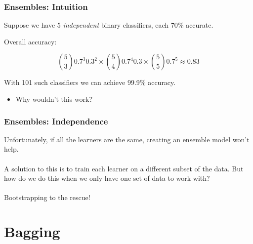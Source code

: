 \documentclass[table,dvipsnames]{beamer}
\newcommand{\keywd}{\textcolor{myorange}}
\begin{document}

\begin{frame}
\frametitle{Ensembles: Intuition}
Suppose we have 5 \textit{independent} binary classifiers, each 70\% accurate.

Overall accuracy:

$$ \binom{5}{3} 0.7^3 0.3^2 \times \binom{5}{4} 0.7^4 0.3 \times \binom{5}{5} 0.7^5 \approx 0.83 $$

With 101 such classifiers we can achieve 99.9\% accuracy.

\begin{itemize}
    \item Why wouldn't this work?
\end{itemize}
\end{frame}


\begin{frame}
\frametitle{Ensembles: Independence}
Unfortunately, if all the learners are the same, creating an ensemble model won't help.
\ \\
\ \\
A solution to this is to train each learner on a different subset of the data.  But how do we do this when we only have one set of data to work with?
\ \\
\ \\
\keywd{Bootstrapping} to the rescue!
\end{frame}



\section{Bagging}
\end{document}
